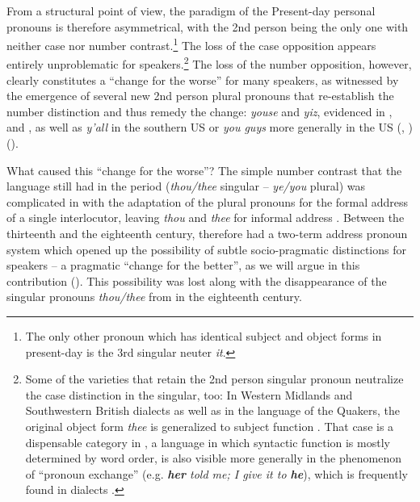 \documentclass[output=paper,hidelinks]{langscibook}
\begin{document}
From a structural point of view, the paradigm of the Present-day  personal pronouns is therefore asymmetrical, with the 2nd person being the only one with neither case nor number contrast.\footnote{The only other pronoun which has identical subject and object forms in present-day  is the 3rd singular neuter \textit{it}.} The loss of the case opposition appears entirely unproblematic for speakers.\footnote{Some of the varieties that retain the 2nd person singular pronoun neutralize the case distinction in the singular, too: In Western Midlands and Southwestern British dialects as well as in the language of the Quakers, the original object form \textit{thee} is generalized to subject function \citep[fn.\,18]{Hernandez2011}. That case is a dispensable category in , a language in which syntactic function is mostly determined by word order, is also visible more generally in the phenomenon of \enquote{pronoun exchange} (e.g. \textit{\textbf{her} told me; I give it to \textbf{he}}), which is frequently found in  dialects \citep[124]{Hernandez2011}.}  The loss of the number opposition, however, clearly constitutes a \enquote{change for the worse} for many speakers, as witnessed by the emergence of several new 2nd person plural pronouns that re-establish the number distinction and thus remedy the change: \textit{youse} and \textit{yiz}, evidenced in ,  and , as well as \textit{y’all} in the southern US or \textit{you guys} more generally in the US (\citealt[154--155]{Lass1999}, \citealt{Hickey2003}) ().\largerpage[1.75]

What caused this \enquote{change for the worse}? The simple number contrast that the language still had in the  period (\textit{thou/thee} singular – \textit{ye/you} plural) was complicated in  with the adaptation of the plural pronouns for the formal address of a single interlocutor, leaving \textit{thou} and \textit{thee} for informal address \citep[e.g.][148--149]{Lass1999}. Between the thirteenth and the eighteenth century,  therefore had a two-term address pronoun system which opened up the possibility of subtle socio-pragmatic distinctions for speakers – a pragmatic \enquote{change for the better}, as we will argue in this contribution (). This possibility was lost along with the disappearance of the singular pronouns \textit{thou/thee} from  in the eighteenth century.
\end{document}
